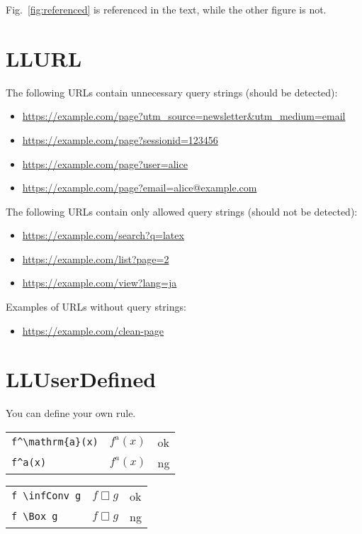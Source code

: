 \documentclass[a4paper]{article}
\newcommand{\tA}[1]{\textcolor{cA}{#1}}
\newcommand{\tD}[1]{\textcolor{cD}{#1}}
\DeclareMathOperator{\infConv}{\Box}
\begin{document}
Fig.~\ref{fig:referenced} is referenced in the text, while the other figure is not.

\section{LLURL}

The following URLs contain unnecessary query strings (should be detected):
\begin{itemize}
    \item \url{https://example.com/page?utm_source=newsletter&utm_medium=email}
    \item \url{https://example.com/page?sessionid=123456}
    \item \url{https://example.com/page?user=alice}
    \item \url{https://example.com/page?email=alice@example.com}
\end{itemize}

The following URLs contain only allowed query strings (should not be detected):
\begin{itemize}
    \item \url{https://example.com/search?q=latex}
    \item \url{https://example.com/list?page=2}
    \item \url{https://example.com/view?lang=ja}
\end{itemize}

Examples of URLs without query strings:
\begin{itemize}
    \item \url{https://example.com/clean-page}
\end{itemize}

\section{LLUserDefined}

You can define your own rule.

\begin{table}[H]
	\centering
	\begin{tabular}{lll}
		\verb|f^\mathrm{a}(x)| & $f^{\mathrm{a}}(x)$ & \tA{ok} \\
		\verb|f^a(x)|          & $f^a(x)$            & \tD{ng} \\
	\end{tabular}
\end{table}

\begin{table}[H]
	\centering
	\begin{tabular}{lll}
		\verb|f \infConv g| & $f \infConv g$ & \tA{ok} \\
		\verb|f \Box g|     & $f \Box g$     & \tD{ng} \\
	\end{tabular}
\end{table}
\end{document}
